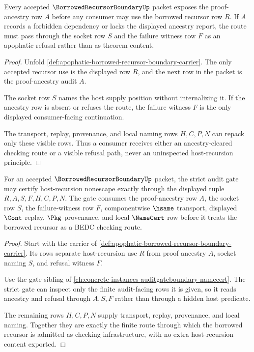 \begin{theorem}
\label{thm:apophatic-borrowed-recursor-boundary-nonescape}
Every accepted $\BorrowedRecursorBoundaryUp$ packet exposes the proof-ancestry row $A$ before any consumer may use the borrowed recursor row $R$. If $A$ records a forbidden dependency or lacks the displayed ancestry report, the route must pass through the socket row $S$ and the failure witness row $F$ as an apophatic refusal rather than as theorem content.
\end{theorem}
\begin{proof}
Unfold \autoref{def:apophatic-borrowed-recursor-boundary-carrier}. The only accepted recursor use is the displayed row $R$, and the next row in the packet is the proof-ancestry audit $A$.

The socket row $S$ names the host supply position without internalizing it. If the ancestry row is absent or refuses the route, the failure witness $F$ is the only displayed consumer-facing continuation.

The transport, replay, provenance, and local naming rows $H,C,P,N$ can repack only these visible rows. Thus a consumer receives either an ancestry-cleared checking route or a visible refusal path, never an uninspected host-recursion principle.
\end{proof}

\begin{theorem}
\label{thm:apophatic-borrowed-recursor-boundary-gate-correspondence}
For an accepted $\BorrowedRecursorBoundaryUp$ packet, the strict audit gate may certify host-recursion nonescape exactly through the displayed tuple $R,A,S,F,H,C,P,N$. The gate consumes the proof-ancestry row $A$, the socket row $S$, the failure-witness row $F$, componentwise $\hsame$ transport, displayed $\Cont$ replay, $\Pkg$ provenance, and local $\NameCert$ row before it treats the borrowed recursor as a BEDC checking route.
\end{theorem}
\begin{proof}
Start with the carrier of \autoref{def:apophatic-borrowed-recursor-boundary-carrier}. Its rows separate host-recursion use $R$ from proof ancestry $A$, socket naming $S$, and refusal witness $F$.

Use the gate sibling of \autoref{ch:concrete-instances-auditgateboundary-namecert}. The strict gate can inspect only the finite audit-facing rows it is given, so it reads ancestry and refusal through $A,S,F$ rather than through a hidden host predicate.

The remaining rows $H,C,P,N$ supply transport, replay, provenance, and local naming. Together they are exactly the finite route through which the borrowed recursor is admitted as checking infrastructure, with no extra host-recursion content exported.
\end{proof}

